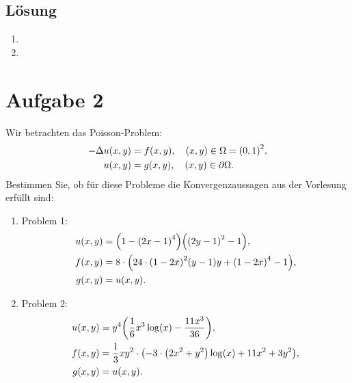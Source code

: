 \documentclass{exercise}
\begin{document}
    \subsection*{Lösung}
    \begin{enumerate}
        \item
        \item
    \end{enumerate}


    \section*{Aufgabe 2}
    
    \begin{problem}
        Wir betrachten das Poisson-Problem:
        \begin{align*}
            -\Delta u\parentheses*{x, y} &= f\parentheses*{x, y}, \quad \parentheses*{x, y} \in \Omega = \parentheses*{0, 1}^2,\\
            u\parentheses*{x, y} &= g\parentheses*{x, y}, \quad \parentheses*{x, y} \in \partial\Omega.
        \end{align*}
        Bestimmen Sie, ob für diese Probleme die Konvergenzaussagen aus der Vorlesung erfüllt sind:
        \begin{enumerate}
            \item Problem 1:
            \begin{align*}
                u\parentheses*{x, y} &= \parentheses*{1 - \parentheses*{2x - 1}^4}\parentheses*{\parentheses*{2y - 1}^2 - 1},\\
                f\parentheses*{x, y} &= 8 \cdot \parentheses*{24 \cdot \parentheses*{1 - 2x}^2\parentheses*{y - 1}y + \parentheses*{1 - 2x}^4 - 1},\\
                g\parentheses*{x, y} &= u\parentheses*{x, y}.
            \end{align*}
            \item Problem 2:
            \begin{align*}
                u\parentheses*{x, y} &= y^4\parentheses*{\frac{1}{6}x^3\log\parentheses*{x} - \frac{11x^3}{36}},\\
                f\parentheses*{x, y} &= \frac{1}{3}xy^2 \cdot \parentheses*{-3 \cdot \parentheses*{2x^2 + y^2}\log\parentheses*{x} + 11x^2 + 3y^2},\\
                g\parentheses*{x, y} &= u\parentheses*{x, y}.
            \end{align*}
        \end{enumerate}
    \end{problem}
    
\end{document}
